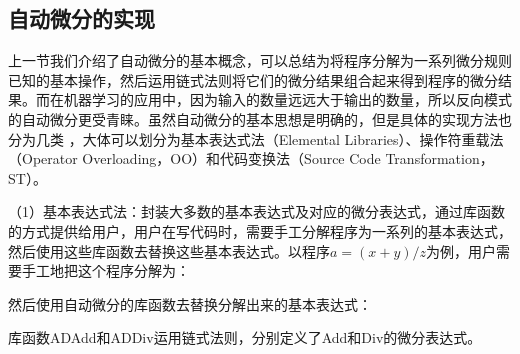 \documentclass[letterpaper,10pt,english]{sphinxmanual}
\begin{document}
\subsection{自动微分的实现}
\label{\detokenize{chapter_frontend_and_ir/ad:id12}}
\sphinxAtStartPar
上一节我们介绍了自动微分的基本概念，可以总结为将程序分解为一系列微分规则已知的基本操作，然后运用链式法则将它们的微分结果组合起来得到程序的微分结果。而在机器学习的应用中，因为输入的数量远远大于输出的数量，所以反向模式的自动微分更受青睐。虽然自动微分的基本思想是明确的，但是具体的实现方法也分为几类
 ，大体可以划分为基本表达式法（Elemental
Libraries）、操作符重载法（Operator
Overloading，OO）和代码变换法（Source Code Transformation，ST）。

\sphinxAtStartPar
（1）基本表达式法：封装大多数的基本表达式及对应的微分表达式，通过库函数的方式提供给用户，用户在写代码时，需要手工分解程序为一系列的基本表达式，然后使用这些库函数去替换这些基本表达式。以程序\(a=(x+y)/z\)为例，用户需要手工地把这个程序分解为：

\begin{sphinxVerbatim}[commandchars=\\\{\}]
    
    
\end{sphinxVerbatim}

\sphinxAtStartPar
然后使用自动微分的库函数去替换分解出来的基本表达式：

\begin{sphinxVerbatim}[commandchars=\\\{\}]
     
      
     
      
\end{sphinxVerbatim}

\sphinxAtStartPar
库函数ADAdd和ADDiv运用链式法则，分别定义了Add和Div的微分表达式。
\end{document}
